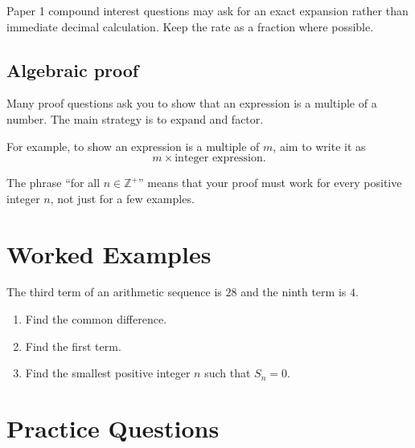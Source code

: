 \begin{examtipbox}
Paper 1 compound interest questions may ask for an exact expansion rather than immediate decimal calculation. Keep the rate as a fraction where possible.
\end{examtipbox}

\subsection{Algebraic proof}

\begin{skillbox}
Many proof questions ask you to show that an expression is a multiple of a number. The main strategy is to expand and factor.

For example, to show an expression is a multiple of $m$, aim to write it as
\[
    m \times \text{integer expression}.
\]
\end{skillbox}

\begin{examtipbox}
The phrase ``for all $n\in\mathbb Z^+$'' means that your proof must work for every positive integer $n$, not just for a few examples.
\end{examtipbox}

\section{Worked Examples}

\begin{workedexam}
The third term of an arithmetic sequence is $28$ and the ninth term is $4$.
\begin{enumerate}[label=(\alph*)]
    \item Find the common difference.
    \item Find the first term.
    \item Find the smallest positive integer $n$ such that $S_n=0$.
\end{enumerate}

\end{workedexam}


\section{Practice Questions}

